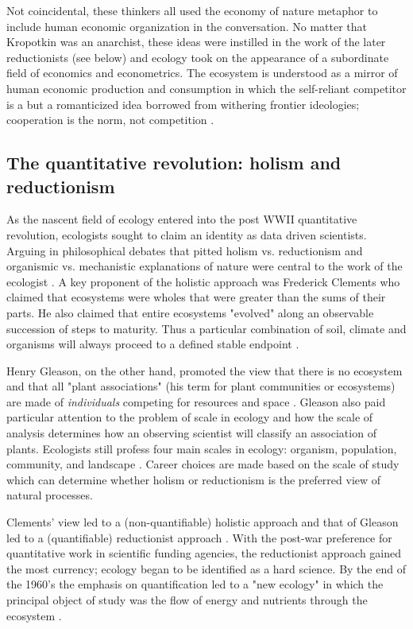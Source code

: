 Not coincidental, these thinkers all used the economy of nature metaphor to include human economic organization in the conversation. No matter that Kropotkin was an anarchist, these ideas were instilled in the work of the later reductionists (see below) and ecology took on the appearance of a subordinate field of economics and econometrics. The ecosystem is understood as a mirror of human economic production and consumption in which the self-reliant competitor is a but a romanticized idea borrowed from withering frontier ideologies; cooperation is the norm, not competition \citep{worster_1977}.

\subsection{The quantitative revolution: holism and reductionism}

As the nascent field of ecology entered into the post WWII quantitative revolution, ecologists sought to claim an identity as data driven scientists. Arguing in philosophical debates that pitted holism vs. reductionism and organismic vs. mechanistic explanations of nature were central to the work of the ecologist \citep{barbour_1996}. A key proponent of the holistic approach was Frederick Clements who claimed that ecosystems were wholes that were greater than the sums of their parts. He also claimed that entire ecosystems "evolved" along an observable succession of steps to maturity. Thus a particular combination of soil, climate and organisms will always proceed to a defined stable endpoint \citep{clements_1936}. 

Henry Gleason, on the other hand, promoted the view that there is no ecosystem and that all "plant associations" (his term for plant communities or ecosystems) are made of \textit{individuals} competing for resources and space \citep{gleason_1939}.  Gleason also paid particular attention to the problem of scale in ecology and how the scale of analysis determines how an observing scientist will classify an association of plants. Ecologists still profess four main scales in ecology: organism, population, community, and landscape \citep{odum_1953}. Career choices are made based on the scale of study which can determine whether holism or reductionism is the preferred view of natural processes.

Clements' view led to a (non-quantifiable) holistic approach and that of Gleason led to a (quantifiable) reductionist approach \citep{barbour_1996,worster_1977}. With the post-war preference for quantitative work in scientific funding agencies, the reductionist approach gained the most currency; ecology began to be identified as a hard science. By the end of the 1960's the emphasis on quantification led to a "new ecology" in which the principal object of study was the flow of energy and nutrients through the ecosystem \citep{worster_1977,barbour_1996}. 

